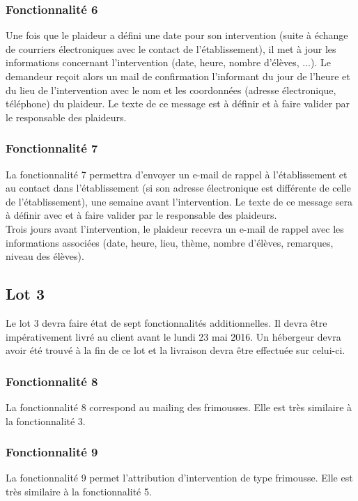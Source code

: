 \subsubsection{Fonctionnalité 6}
Une fois que le plaideur a défini une date pour son intervention (suite à échange de courriers électroniques avec le contact de l'établissement), il met à jour les informations concernant l'intervention (date, heure, nombre d'élèves, ...). Le demandeur reçoit alors un mail de confirmation l'informant du jour de l'heure et du lieu de l'intervention avec le nom et les coordonnées (adresse électronique, téléphone) du plaideur. Le texte de ce message est à définir et à faire valider par le responsable des plaideurs. \\

\subsubsection{Fonctionnalité 7}
La fonctionnalité 7 permettra d'envoyer un e-mail de rappel à l'établissement et au contact dans l'établissement (si son adresse électronique est différente de celle de l'établissement), une semaine avant l'intervention. Le texte de ce message sera à définir avec \nomClient{} et à faire valider par le responsable des plaideurs. \\
Trois jours avant l'intervention, le plaideur recevra un e-mail de rappel avec les informations associées (date, heure, lieu, thème, nombre d'élèves, remarques, niveau des élèves). 
\\

\subsection{Lot 3}
Le lot 3 devra faire état de sept fonctionnalités additionnelles. Il devra être impérativement livré au client avant le lundi 23 mai 2016. Un hébergeur devra avoir été trouvé à la fin de ce lot et la livraison devra être effectuée sur celui-ci.

\subsubsection{Fonctionnalité 8}
La fonctionnalité 8 correspond au mailing des frimousses. Elle est très similaire à la fonctionnalité 3.

\subsubsection{Fonctionnalité 9}
La fonctionnalité 9 permet l'attribution d'intervention de type frimousse. Elle est très similaire à la fonctionnalité 5.


